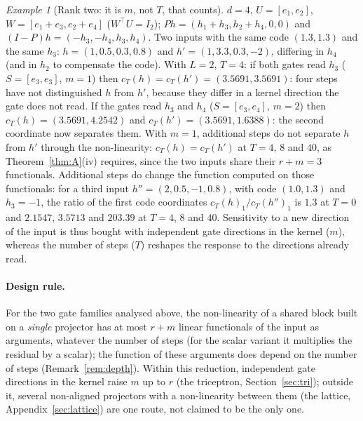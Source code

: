 \documentclass[11pt,a4paper]{article}
\theoremstyle{plain}
\theoremstyle{definition}
\theoremstyle{remark}
\newtheorem{example}{Example}
\newcommand{\T}{\top}
\begin{document}
\begin{example}[Rank two: it is $m$, not $T$, that counts]
\label{ex:A3}
$d=4$, $U=[e_1,e_2]$, $W=[e_1+e_3,e_2+e_4]$ ($W^\T U=I_2$); $Ph=(h_1+h_3,h_2+h_4,0,0)$
and $(I-P)h=(-h_3,-h_4,h_3,h_4)$. Two inputs with the same code $(1.3,1.3)$
and the same $h_3$: $h=(1,0.5,0.3,0.8)$ and $h'=(1,3.3,0.3,-2)$, differing in
$h_4$ (and in $h_2$ to compensate the code). With $L=2$, $T=4$:
if both gates read $h_3$ ($S=[e_3,e_3]$, $m=1$) then
$c_T(h)=c_T(h')=(3.5691,3.5691)$: four steps have not distinguished $h$ from
$h'$, because they differ in a kernel direction the gate does not read. If
the gates read $h_3$ and $h_4$ ($S=[e_3,e_4]$, $m=2$) then
$c_T(h)=(3.5691,4.2542)$ and $c_T(h')=(3.5691,1.6388)$: the second coordinate
now separates them. With $m=1$, additional steps do not separate $h$ from
$h'$ through the non-linearity: $c_T(h)=c_T(h')$ at $T=4$, $8$ and $40$,
as Theorem~\ref{thm:A}(iv) requires, since the two inputs share their
$r+m=3$ functionals. Additional steps do change the function computed on
those functionals: for a third input $h''=(2,0.5,-1,0.8)$, with code
$(1.0,1.3)$ and $h_3=-1$, the ratio of the first code coordinates
$c_T(h)_1/c_T(h'')_1$ is $1.3$ at $T=0$ and $2.1547$, $3.5713$ and
$203.39$ at $T=4$, $8$ and $40$. Sensitivity to a new direction of the
input is thus bought with independent gate directions in the kernel
($m$), whereas the number of steps ($T$) reshapes the response to the
directions already read.
\end{example}

\paragraph{Design rule.} For the two gate families analysed above, the
non-linearity of a shared block built on a \emph{single} projector has at
most $r+m$ linear functionals of the input as arguments, whatever the
number of steps (for the scalar variant it multiplies the residual by a
scalar); the function of these arguments does depend on the number of
steps (Remark~\ref{rem:depth}). Within this reduction, independent gate directions in the kernel
raise $m$ up to $r$ (the triceptron, Section~\ref{sec:tri}); outside it,
several non-aligned projectors with a non-linearity between them (the
lattice, Appendix~\ref{sec:lattice}) are one route, not claimed to be the
only one.

\end{document}
